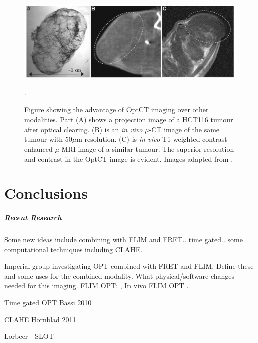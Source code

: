 \documentclass[12pt]{article}
\begin{document}
\begin{figure}[H]
\centering
\includegraphics[scale=1]{Oldham_2006_tumourstaining.jpg}
\caption{Figure showing the advantage of OptCT imaging over other modalities. Part (A) shows a projection image of a HCT116 tumour after optical clearing. (B) is an \textit{in vivo} $\mu$-CT image of the same tumour with 50$\mu$m resolution. (C) is \textit{in vivo} T1 weighted contrast enhanced $\mu$-MRI image of a similar tumour. The superior resolution and contrast in the OptCT image is evident. Images  adapted from \cite{Oldham:2006}.}.
\label{fig:tumourstaining}
\end{figure}






\section{Conclusions}


\subparagraph{Recent Research} 
Some new ideas include combining with FLIM and FRET.. time gated.. some computational techniques including CLAHE.


Imperial group investigating OPT combined 
with FRET and FLIM. Define these and some uses for the combined modality.
 What physical/software changes needed for this imaging.
FLIM OPT: \cite{McGinty:2008ix}, In vivo FLIM OPT \cite{McGinty:2011vm}.

 Time gated OPT Bassi 2010 \cite{Bassi:2010}
 
 CLAHE Hornblad 2011 \cite{Hornblad:2011fh}

Lorbeer - SLOT \cite{Lorbeer:2011}


\newpage

\end{document}
